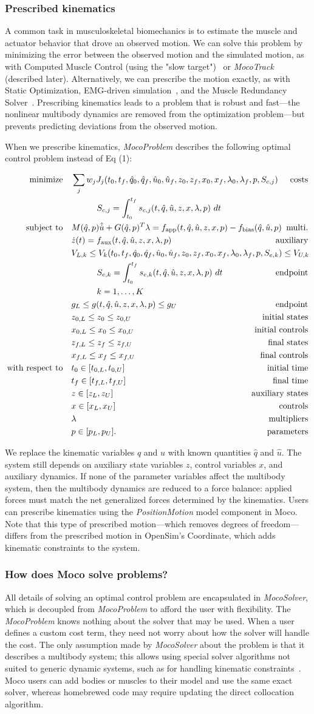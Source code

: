 \documentclass[10pt,letterpaper]{article}
\newcommand{\prescribed}{
\begin{align}
    \begin{aligned}
        \mbox{minimize} \quad & \sum_j w_j J_{j}(t_0, t_f, \hat{q}_0, \hat{q}_f, \hat{u}_0, \hat{u}_f, z_0, z_f, x_{0}, x_{f}, \lambda_0, \mathrlap{\lambda_f, p, S_{c,j})} & \textrm{costs} \\
        & \quad\quad\quad S_{c,j} = \int_{t_0}^{t_f} s_{c,j}(t, \hat{q}, \hat{u}, z, x, \lambda, p)~dt\\
        \mbox{subject to} \quad &
         M(\hat{q}, p)\hat{\dot{u}} + G(\hat{q}, p)^T \lambda = f_{\textrm{app}}(t, \hat{q}, \hat{u}, z, x, p) - \mathrlap{f_{\textrm{bias}}(\hat{q}, \hat{u}, p)} & \textrm{multi.} \\
         & \dot{z}(t) = f_{\textrm{aux}}(t, \hat{q}, \hat{u}, z, x, \lambda, p) & \textrm{auxiliary} \\
         & V_{L,k} \leq V_k(t_0, t_f, \hat{q}_0, \hat{q}_f, \hat{u}_0, \hat{u}_f, z_0, z_f, x_{0}, x_{f}, \lambda_0, \mathrlap{\lambda_f, p, S_{e,k}) \leq V_{U,k}} \\
        & \quad\quad\quad S_{e,k} = \int_{t_0}^{t_f} s_{e,k}(t, \hat{q}, \hat{u}, z, x, \lambda, p)~dt & \textrm{endpoint} \\
         & \quad\quad\quad k = 1, \ldots, K \\
        & g_{L} \leq g(t, \hat{q}, \hat{u}, z, x, \lambda, p) \leq g_{U} & \textrm{endpoint} \\
         & z_{0,L} \leq z_0 \leq z_{0,U} & \textrm{initial states} \\
         & x_{0,L} \leq x_0 \leq x_{0,U} & \textrm{initial controls}\\
         & z_{f,L} \leq z_f \leq z_{f,U} & \textrm{final states} \\
         & x_{f,L} \leq x_f \leq x_{f,U} & \textrm{final controls} \\
         \mbox{with respect to} \quad
         & t_0 \in [t_{0,L}, t_{0,U}] & \textrm{initial time} \\
         & t_f \in [t_{f,L}, t_{f,U}] & \textrm{final time} \\
         & z \in [z_{L}, z_{U}] & \textrm{auxiliary states} \\
         & x \in [x_{L}, x_{U}] & \textrm{controls} \\
         & \lambda & \textrm{multipliers} \\
         & p \in [p_{L}, p_{U}]. & \textrm{parameters}
    \end{aligned}
\end{align}
}
\begin{document}
\subsubsection*{Prescribed kinematics}

A common task in musculoskeletal biomechanics is to estimate the muscle and actuator behavior that drove an observed motion. We can solve this problem by minimizing the error between the observed motion and the simulated motion, as with Computed Muscle Control (using the "slow target")~\cite{Thelen:2003bba} or \textit{MocoTrack} (described later). Alternatively, we can prescribe the motion exactly, as with Static Optimization, EMG-driven simulation~\cite{Lloyd:2003}, and the Muscle Redundancy Solver~\cite{Groote:2016dq}. Prescribing kinematics leads to a problem that is robust and fast---the nonlinear multibody dynamics are removed from the optimization problem---but prevents predicting deviations from the observed motion.

When we prescribe kinematics, \textit{MocoProblem} describes the following optimal control problem instead of Eq (1):

\prescribed

We replace the kinematic variables $q$ and $u$ with known quantities $\hat{q}$ and $\hat{u}$. The system still depends on auxiliary state variables $z$, control variables $x$, and auxiliary dynamics. If none of the parameter variables affect the multibody system, then the multibody dynamics are reduced to a force balance: applied forces must match the net generalized forces determined by the kinematics. Users can prescribe kinematics using the \textit{PositionMotion} model component in Moco. Note that this type of prescribed motion---which removes degrees of freedom---differs from the prescribed motion in OpenSim’s Coordinate, which adds kinematic constraints to the system.

\subsubsection*{How does Moco solve problems?}

All details of solving an optimal control problem are encapsulated in \textit{MocoSolver}, which is decoupled from \textit{MocoProblem} to afford the user with flexibility. The \textit{MocoProblem} knows nothing about the solver that may be used. When a user defines a custom cost term, they need not worry about how the solver will handle the cost. The only assumption made by \textit{MocoSolver} about the problem is that it describes a multibody system; this allows using special solver algorithms not suited to generic dynamic systems, such as for handling kinematic constraints~\cite{Posa:2016}.
Moco users can add bodies or muscles to their model and use the same exact solver, whereas homebrewed code may require updating the direct collocation algorithm.
\end{document}
